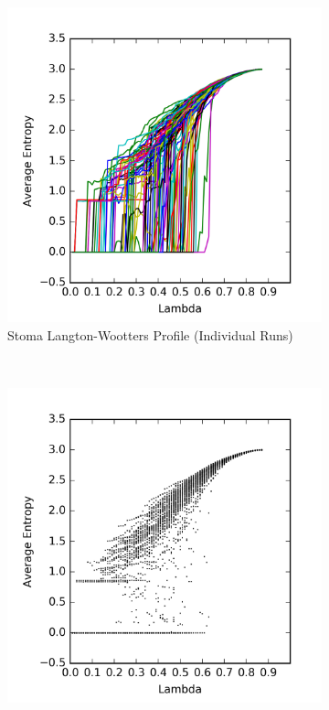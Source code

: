 \documentclass[a4paper,11pt,twoside]{report}
\begin{document}
\begin{figure}[htp]
\centering
\begin{subfigure}[t]{0.6\textwidth}
  \includegraphics[width=\textwidth]{ch6_figs/stoma_entropy}
  \caption{Stoma Langton-Wootters Profile (Individual Runs)}
  \label{fig:stoma_lw_run}
\end{subfigure}
~
\begin{subfigure}[t]{0.6\textwidth}
  \centering
  \includegraphics[width=\textwidth]{ch6_figs/stoma_entropy_scatter}

\end{subfigure}
\end{figure}
\end{document}
